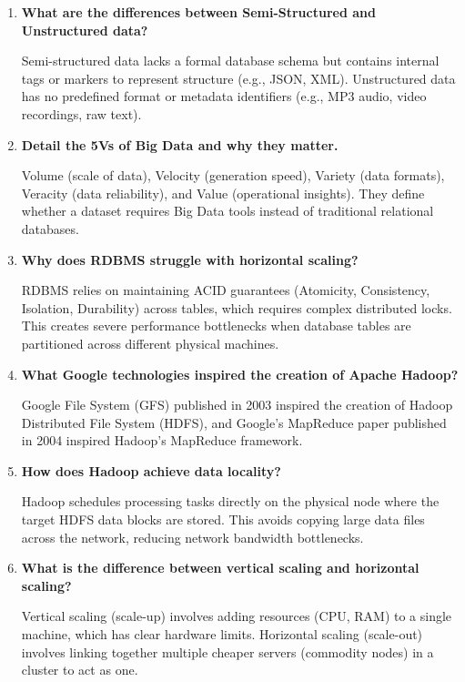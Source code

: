 \documentclass[12pt,a4paper]{article}
\newcommand{\Q}[1]{\textbf{#1}\par\noindent\ignorespaces}
\begin{document}
\vspace{6pt}

\begin{tcolorbox}[exambox, title={\textbf{Frequently Asked / Viva Questions}}]
\begin{enumerate}[leftmargin=*, topsep=0pt, label=\textbf{Q\arabic*.}, itemsep=5pt]
  \item \Q{What are the differences between Semi-Structured and Unstructured data?}
        Semi-structured data lacks a formal database schema but contains internal tags or markers to represent structure (e.g., JSON, XML). Unstructured data has no predefined format or metadata identifiers (e.g., MP3 audio, video recordings, raw text).
        
  \item \Q{Detail the 5Vs of Big Data and why they matter.}
        Volume (scale of data), Velocity (generation speed), Variety (data formats), Veracity (data reliability), and Value (operational insights). They define whether a dataset requires Big Data tools instead of traditional relational databases.
        
  \item \Q{Why does RDBMS struggle with horizontal scaling?}
        RDBMS relies on maintaining ACID guarantees (Atomicity, Consistency, Isolation, Durability) across tables, which requires complex distributed locks. This creates severe performance bottlenecks when database tables are partitioned across different physical machines.
        
  \item \Q{What Google technologies inspired the creation of Apache Hadoop?}
        Google File System (GFS) published in 2003 inspired the creation of Hadoop Distributed File System (HDFS), and Google's MapReduce paper published in 2004 inspired Hadoop's MapReduce framework.
        
  \item \Q{How does Hadoop achieve data locality?}
        Hadoop schedules processing tasks directly on the physical node where the target HDFS data blocks are stored. This avoids copying large data files across the network, reducing network bandwidth bottlenecks.
        
  \item \Q{What is the difference between vertical scaling and horizontal scaling?}
        Vertical scaling (scale-up) involves adding resources (CPU, RAM) to a single machine, which has clear hardware limits. Horizontal scaling (scale-out) involves linking together multiple cheaper servers (commodity nodes) in a cluster to act as one.
        

\end{enumerate}
\end{tcolorbox}
\end{document}
